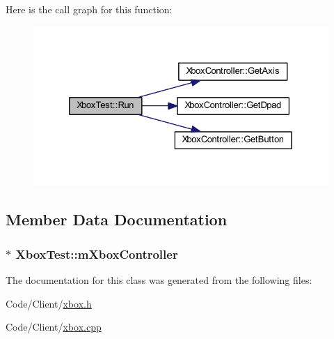 \-Here is the call graph for this function\-:\nopagebreak
\begin{figure}[H]
\begin{center}
\leavevmode
\includegraphics[width=326pt]{class_xbox_test_a366167361a23d736dadecb00f7c34dc8_cgraph}
\end{center}
\end{figure}




\subsection{\-Member \-Data \-Documentation}
\hypertarget{class_xbox_test_a1147139354a903fe20cbd689b5ee6ba9}{
\subsubsection[{m\-Xbox\-Controller}]{$\ast$ {\bf \-Xbox\-Test\-::m\-Xbox\-Controller}}}\label{class_xbox_test_a1147139354a903fe20cbd689b5ee6ba9}


\-The documentation for this class was generated from the following files\-:\begin{DoxyCompactItemize}
\item 
\-Code/\-Client/\hyperlink{xbox_8h}{xbox.\-h}\item 
\-Code/\-Client/\hyperlink{xbox_8cpp}{xbox.\-cpp}\end{DoxyCompactItemize}
